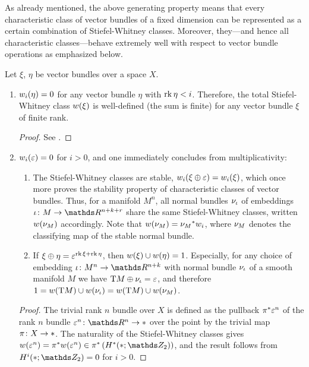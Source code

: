 As already mentioned, the above generating property means that every
characteristic class of vector bundles of a fixed dimension can be
represented as a certain combination of Stiefel-Whitney classes.
Moreover, they---and hence all characteristic classes---behave
extremely well with respect to vector bundle operations as emphasized
below.
\begin{Rem}
  \label{rem:propswclasses}
  Let $\xi$, $\eta$ be vector bundles over a space $X$.
  \begin{enumerate} 
  \item\label{item:propswclasses:dimesioncut} ${w_{i}}(\eta) = 0$
    for any vector bundle $\eta$ with $\operatorname{rk}\eta < i$.
    Therefore, the total Stiefel-Whitney class ${w}(\xi)$ is
    well-defined (\idest the sum is finite)
    for any vector bundle $\xi$ of finite rank.
    \begin{proof}
      See \cite[Sec.~19.4]{tomdieck}.
    \end{proof}
  \item\label{item:swoftrivbdl}
    ${w_{i}}(\varepsilon)=0$ for $i>0$, and one immediately concludes
    from multiplicativity:
    \begin{enumerate}
    \item\label{item:swclassesstable}
      The Stiefel-Whitney classes are stable, \idest
      ${w_{i}}(\xi\oplus\varepsilon) = {w_{i}}(\xi)$, which once more proves
      the stability property of characteristic classes of vector bundles.
      Thus, for a manifold $M^n$, all normal bundles $\nu_{{\iota}}$ of
      embeddings $\emb\colon M\to\R^{n+k+r}$ share the same
      Stiefel-Whitney classes, written ${w}(\nu_{M})$ accordingly.
      Note that ${w}(\nu_{M}) = {\nu_{M}}^*w_{i}$, where $\nu_{M}$ denotes the
      classifying map of the stable normal bundle.
    \item\label{item:wuclassmfdinverse}
      If $\xi\oplus\eta = \varepsilon^{\operatorname{rk}\xi+\operatorname{rk}\eta}$, then
      ${w}(\xi)\cup{w}(\eta)=1$.
      Especially, for any choice of embedding $\emb\colon M^n\to\R^{n+k}$
      with normal bundle $\nu_{{\iota}}$ of a smooth manifold $M$ we have
      $\mathrm{T}M\oplus\nu_{{\iota}} = \varepsilon$, and therefore
      $1 = {w}(\mathrm{T}M) \cup {w}(\nu_{{\iota}}) = {w}(\mathrm{T}M)\cup{w}(\nu_{M})$.
    \end{enumerate}
    \begin{proof}
      The trivial rank $n$ bundle over $X$ is defined as the pullback
      ${\pi}^* \varepsilon^n$ of the rank $n$ bundle
      $\trivbdl^n\colon \R^n\to\pt$ over the point by the trivial map
      $\pi\colon X\to*$. The naturality of the Stiefel-Whitney
      classes gives $\W{\trivbdl^n} = \pb\pi \W{\trivbdl^n}
      \in\pb\pi \left(\H^*(\pt;\Zmod2)\right)$,
      and the result follows from $\H^i(\pt;\Zmod2) = 0$ for $i>0$.
    \end{proof}
  \end{enumerate}
\end{Rem}

